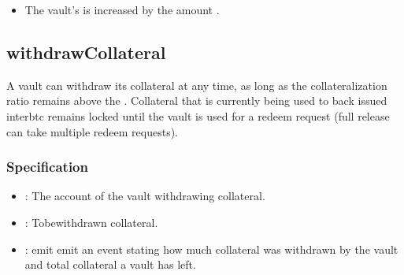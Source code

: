 \documentclass[a4paper,10pt,english]{sphinxmanual}
\begin{document}
\begin{itemize}
\item {} 
The vault’s  is increased by the amount .

\end{itemize}


\subsection{withdrawCollateral}
\label{\detokenize{spec/vault-registry:withdrawcollateral}}\label{\detokenize{spec/vault-registry:id11}}
A vault can withdraw its  collateral at any time, as long as the collateralization ratio remains above the . Collateral that is currently being used to back issued interbtc remains locked until the vault is used for a redeem request (full release can take multiple redeem requests).


\subsubsection{Specification}
\label{\detokenize{spec/vault-registry:id12}}


\begin{itemize}
\item {} 
: The account of the vault withdrawing collateral.

\item {} 
: To\sphinxhyphen{}be\sphinxhyphen{}withdrawn collateral.

\end{itemize}

\begin{itemize}
\item {} 
: emit emit an event stating how much collateral was withdrawn by the vault and total collateral a vault has left.

\end{itemize}
\end{document}
